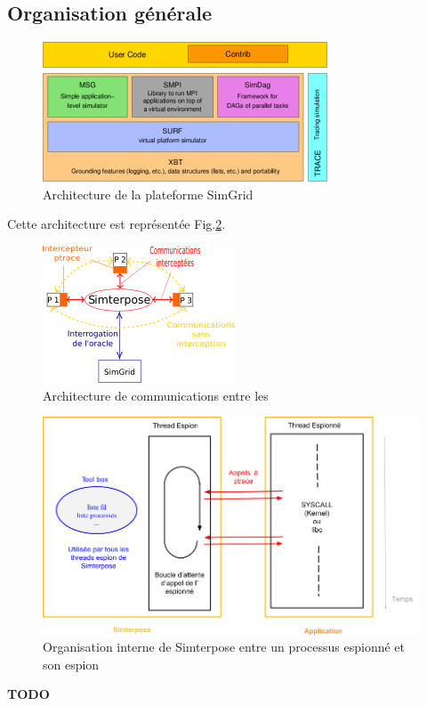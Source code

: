 \subsection{Organisation générale}

\begin{figure}[H]
  \centering
  \includegraphics{Pictures/png/SimGrid}
  \caption{Architecture de la plateforme SimGrid}
  \label{SimGrid}
\end{figure}

Cette architecture est représentée Fig.\ref{Organisation_generale}.

\begin{figure}[H]
  \centering
  \includegraphics{Pictures/png/Communications_Simterpose_interprocess_v2}
  \caption{Architecture de communications entre les}
  \label{Organisation_generale}
\end{figure}
  
\begin{figure}[H]
  \centering
  \includegraphics[scale=0.5]{Pictures/png/Simterpose_orga_code_v3}
  \caption{Organisation interne de Simterpose entre un processus espionné et son espion}
  \label{Organisation_Simterpose}
\end{figure}

{\color{red} \textbf{TODO}}
